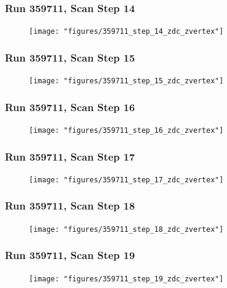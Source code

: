 \begin{frame}
\frametitle{Run 359711, Scan Step 14}
\begin{figure}
\begin{center}
\texttt{[image: "figures/359711\_step\_14\_zdc\_zvertex"]}
\caption{ }
\label{fig:359711_step_14_zdc_zvertex}
\end{center}\end{figure}
\end{frame}

\begin{frame}
\frametitle{Run 359711, Scan Step 15}
\begin{figure}
\begin{center}
\texttt{[image: "figures/359711\_step\_15\_zdc\_zvertex"]}
\caption{ }
\label{fig:359711_step_15_zdc_zvertex}
\end{center}\end{figure}
\end{frame}

\begin{frame}
\frametitle{Run 359711, Scan Step 16}
\begin{figure}
\begin{center}
\texttt{[image: "figures/359711\_step\_16\_zdc\_zvertex"]}
\caption{ }
\label{fig:359711_step_16_zdc_zvertex}
\end{center}\end{figure}
\end{frame}

\begin{frame}
\frametitle{Run 359711, Scan Step 17}
\begin{figure}
\begin{center}
\texttt{[image: "figures/359711\_step\_17\_zdc\_zvertex"]}
\caption{ }
\label{fig:359711_step_17_zdc_zvertex}
\end{center}\end{figure}
\end{frame}

\begin{frame}
\frametitle{Run 359711, Scan Step 18}
\begin{figure}
\begin{center}
\texttt{[image: "figures/359711\_step\_18\_zdc\_zvertex"]}
\caption{ }
\label{fig:359711_step_18_zdc_zvertex}
\end{center}\end{figure}
\end{frame}

\begin{frame}
\frametitle{Run 359711, Scan Step 19}
\begin{figure}
\begin{center}
\texttt{[image: "figures/359711\_step\_19\_zdc\_zvertex"]}
\caption{ }
\label{fig:359711_step_19_zdc_zvertex}
\end{center}\end{figure}
\end{frame}

